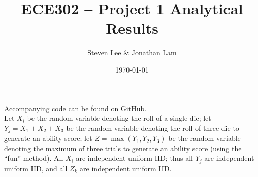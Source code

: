 \documentclass{article}
\title{ECE302 -- Project 1 Analytical Results}
\author{Steven Lee \& Jonathan Lam}
\date{\today}
\begin{document}
	\maketitle
	
	\noindent Accompanying code can be found \href{https://github.com/jlam55555/ece302-hw/blob/main/hw1/hw1.m}{on GitHub}.\\
	
	\noindent Let $X_i$ be the random variable denoting the roll of a single die; let $Y_j=X_1+X_2+X_3$ be the random variable denoting the roll of three die to generate an ability score; let $Z=\max(Y_1,Y_2,Y_3)$ be the random variable denoting the maximum of three trials to generate an ability score (using the ``fun'' method). All $X_i$ are independent uniform IID; thus all $Y_j$ are independent uniform IID, and all $Z_k$ are independent uniform IID.
	
\end{document}

